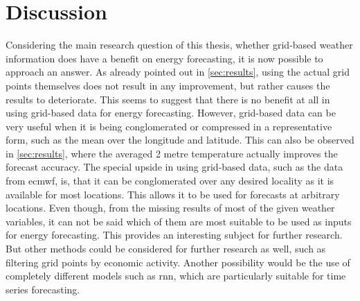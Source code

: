 \chapter{Discussion}
\label{ch:discussion}

Considering the main research question of this thesis, whether grid-based weather information does have a benefit on energy forecasting, it is now possible to approach an answer. As already pointed out in \cref{sec:results}, using the actual grid points themselves does not result in any improvement, but rather causes the results to deteriorate. This seems to suggest that there is no benefit at all in using grid-based data for energy forecasting. However, grid-based data can be very useful when it is being conglomerated or compressed in a representative form, such as the mean over the longitude and latitude. This can also be observed in \cref{sec:results}, where the averaged 2 metre temperature actually improves the forecast accuracy. The special upside in using grid-based data, such as the data from \gls{ecmwf}, is, that it can be conglomerated over any desired locality as it is available for most locations. This allows it to be used for forecasts at arbitrary locations. Even though, from the missing results of most of the given weather variables, it can not be said which of them are most suitable to be used as inputs for energy forecasting. This provides an interesting subject for further research. But other methods could be considered for further research as well, such as filtering grid points by economic activity. Another possibility would be the use of completely different models such as \gls{rnn}, which are particularly suitable for time series forecasting.\\

%

